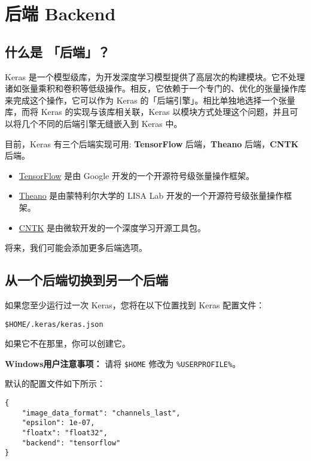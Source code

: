
\section{后端 Backend}\label{keras-backend}

\subsection{什么是 「后端」？}

Keras
是一个模型级库，为开发深度学习模型提供了高层次的构建模块。它不处理诸如张量乘积和卷积等低级操作。相反，它依赖于一个专门的、优化的张量操作库来完成这个操作，它可以作为
Keras 的「后端引擎」。相比单独地选择一个张量库，而将 Keras
的实现与该库相关联，Keras
以模块方式处理这个问题，并且可以将几个不同的后端引擎无缝嵌入到 Keras
中。

目前，Keras 有三个后端实现可用: \textbf{TensorFlow}
后端，\textbf{Theano} 后端，\textbf{CNTK} 后端。

\begin{itemize}
\tightlist
\item
  \href{http://www.tensorflow.org/}{TensorFlow} 是由 Google
  开发的一个开源符号级张量操作框架。
\item
  \href{http://deeplearning.net/software/theano/}{Theano}
  是由蒙特利尔大学的 LISA Lab 开发的一个开源符号级张量操作框架。
\item
  \href{https://www.microsoft.com/en-us/cognitive-toolkit/}{CNTK}
  是由微软开发的一个深度学习开源工具包。
\end{itemize}

将来，我们可能会添加更多后端选项。


\subsection{从一个后端切换到另一个后端}\label{ux4eceux4e00ux4e2aux540eux7aefux5207ux6362ux5230ux53e6ux4e00ux4e2aux540eux7aef}

如果您至少运行过一次 Keras，您将在以下位置找到 Keras 配置文件：

\texttt{\$HOME/.keras/keras.json}

如果它不在那里，你可以创建它。

\textbf{Windows用户注意事项：} 请将 \texttt{\$HOME} 修改为
\texttt{\%USERPROFILE\%}。

默认的配置文件如下所示：

\begin{verbatim}
{
    "image_data_format": "channels_last",
    "epsilon": 1e-07,
    "floatx": "float32",
    "backend": "tensorflow"
}
\end{verbatim}

